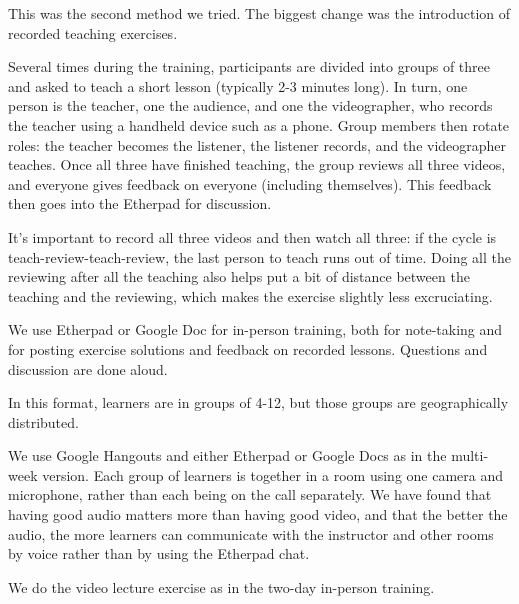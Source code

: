 
This was the second method we tried. The biggest change was the
introduction of recorded teaching exercises.

\begin{gitemize}

\item
  Several times during the training, participants are divided into
  groups of three and asked to teach a short lesson (typically 2-3
  minutes long). In turn, one person is the teacher, one the audience,
  and one the videographer, who records the teacher using a handheld
  device such as a phone. Group members then rotate roles: the teacher
  becomes the listener, the listener records, and the videographer
  teaches. Once all three have finished teaching, the group reviews
  all three videos, and everyone gives feedback on everyone (including
  themselves). This feedback then goes into the Etherpad for
  discussion.

\item
  It's important to record all three videos and then watch all three:
  if the cycle is teach-review-teach-review, the last person to teach
  runs out of time. Doing all the reviewing after all the teaching
  also helps put a bit of distance between the teaching and the
  reviewing, which makes the exercise slightly less excruciating.

\item
  We use Etherpad or Google Doc for in-person training, both for
  note-taking and for posting exercise solutions and feedback on
  recorded lessons.  Questions and discussion are done aloud.

\end{gitemize}


In this format, learners are in groups of 4-12, but those groups are
geographically distributed.

\begin{gitemize}

\item
  We use Google Hangouts and either Etherpad or Google Docs as in the
  multi-week version. Each group of learners is together in a room
  using one camera and microphone, rather than each being on the call
  separately. We have found that having good audio matters more than
  having good video, and that the better the audio, the more learners
  can communicate with the instructor and other rooms by voice rather
  than by using the Etherpad chat.

\item
  We do the video lecture exercise as in the two-day in-person training.

\end{gitemize}

